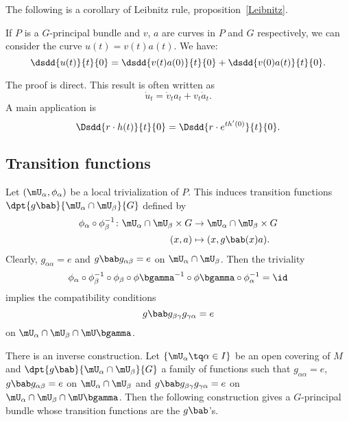 	The following is a corollary of Leibnitz rule, proposition~\ref{Leibnitz}.
	\begin{corollary}  \label{cor_PrincLeib}
	If $P$ is a $G$-principal bundle and $v$, $a$ are curves in $P$ and $G$ respectively, we can consider the curve $u(t)=v(t)a(t)$. We have:
	\[
		\dsdd{u(t)}{t}{0}=\dsdd{v(t)a(0)}{t}{0}+\dsdd{v(0)a(t)}{t}{0}.
		\]
		\end{corollary}
		The proof is direct. This result is often written as
		\begin{equation}
		\dot{u}_t=\dot{v}_ta_t+v_t\dot{a}_t.
		\end{equation}
		A main application is
		\begin{equation}\label{eq:rdotht}
		\Dsdd{ r\cdot h(t) }{t}{0}=\Dsdd{r\cdot e^{th'(0)}}{t}{0}.
		\end{equation}

		\subsection{Transition functions}


		Let $(\mU_{\alpha},\phi_{\alpha})$ be a local trivialization of $P$. This induces transition functions $\dpt{g\bab}{\mU_{\alpha}\cap\mU_{\beta}}{G}$ defined by
		\begin{equation}
		\begin{aligned}
		\phi_{\alpha}\circ\phi_{\beta}^{-1}\colon \mU_{\alpha}\cap\mU_{\beta}\times G & \to \mU_{\alpha}\cap\mU_{\beta}\times G       \\
			(x,a)                                                                         & \mapsto (x,g\bab(x)a).\label{eq:transi_princ}
			\end{aligned}
			\end{equation}
			Clearly, $g_{\alpha\alpha}=e$ and $g\bab g_{\alpha\beta}=e$ on $\mU_{\alpha}\cap\mU_{\beta}$. Then the triviality
			\[
				\phi_{\alpha}\circ\phi_{\beta}^{-1}\circ\phi_{\beta}\circ\phi\bgamma^{-1}\circ\phi\bgamma\circ\phi_{\alpha}^{-1}=\id
				\]
				implies the compatibility conditions
				\begin{equation}
				g\bab g_{\beta\gamma} g_{\gamma\alpha}=e
				\end{equation}
				on $\mU_{\alpha}\cap\mU_{\beta}\cap\mU\bgamma$.

				There is an inverse construction. Let $\{\mU_{\alpha}\tq\alpha\in I\}$ be an open covering of $M$ and $\dpt{g\bab}{\mU_{\alpha}\cap\mU_{\beta}}{G}$ a family of functions such that $g_{\alpha\alpha}=e$, $g\bab g_{\alpha\beta}=e$ on $\mU_{\alpha}\cap\mU_{\beta}$ and $g\bab g_{\beta\gamma}g_{\gamma\alpha}=e$ on $\mU_{\alpha}\cap\mU_{\beta}\cap\mU\bgamma$. Then the following construction gives a $G$-principal bundle whose transition functions are the $g\bab$'s.


